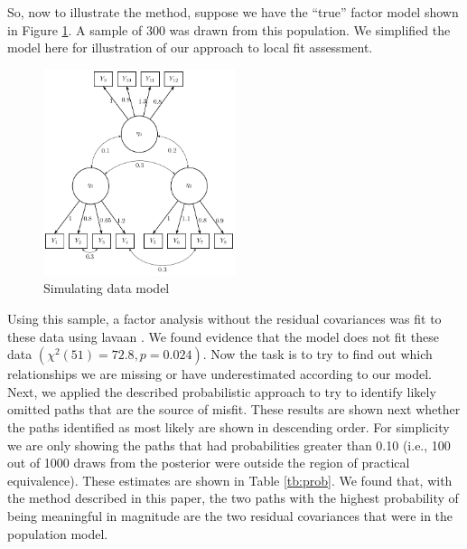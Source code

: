 \documentclass[man, noextraspace, floatsintext, 12pt]{apa7}
\begin{document}
So, now to illustrate the method, suppose we have the ``true'' factor model shown in Figure \ref{fig:model}.
A sample of 300 was drawn from this population.
We simplified the model here for illustration of our approach to local fit assessment.
\begin{figure}
\centering
\includegraphics[width=0.5\textwidth]{fig/sim_factor_structure_values}
\caption{Simulating data model}
\label{fig:model}
\end{figure}
Using this sample, a factor analysis without the residual covariances was fit to these data using \textsf{lavaan} \citep{Rosseel2012}.
We found evidence that the model does not fit these data $(\chi^2(51) = 72.8, p = 0.024)$.
Now the task is to try to find out which relationships we are missing or have underestimated according to our model.
Next, we applied the described probabilistic approach to try to identify likely omitted paths that are the source of misfit.
These results are shown next whether the paths identified as most likely are shown in descending order. 
For simplicity we are only showing the paths that had probabilities greater than 0.10 (i.e., 100 out of 1000 draws from the posterior were outside the region of practical equivalence).
These estimates are shown in Table \ref{tb:prob}.
We found that, with the method described in this paper, the two paths with the highest probability of being meaningful in magnitude are the two residual covariances that were in the population model.
\end{document}
